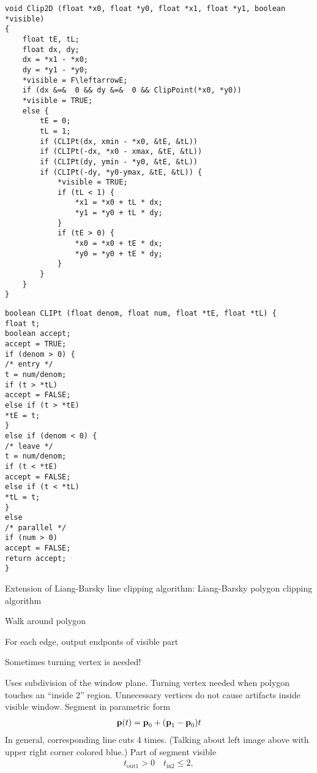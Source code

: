 \begin{compactdesc}
\begin{lstlisting}
void Clip2D (float *x0, float *y0, float *x1, float *y1, boolean *visible)
{
	float tE, tL;
	float dx, dy;
	dx = *x1 - *x0;
	dy = *y1 - *y0;
	*visible = F\leftarrowE;
	if (dx &=&  0 && dy &=&  0 && ClipPoint(*x0, *y0))
	*visible = TRUE;
	else {
		tE = 0;
		tL = 1;
		if (CLIPt(dx, xmin - *x0, &tE, &tL))
		if (CLIPt(-dx, *x0 - xmax, &tE, &tL))
		if (CLIPt(dy, ymin - *y0, &tE, &tL))
		if (CLIPt(-dy, *y0-ymax, &tE, &tL)) {
			*visible = TRUE;
			if (tL < 1) {
				*x1 = *x0 + tL * dx;
				*y1 = *y0 + tL * dy;
			}
			if (tE > 0) {
				*x0 = *x0 + tE * dx;
				*y0 = *y0 + tE * dy;
			}
		}
	}
}
		\end{lstlisting}
		\begin{lstlisting}
boolean CLIPt (float denom, float num, float *tE, float *tL) {
float t;
boolean accept;
accept = TRUE;
if (denom > 0) {
/* entry */
t = num/denom;
if (t > *tL)
accept = FALSE;
else if (t > *tE)
*tE = t;
}
else if (denom < 0) {
/* leave */
t = num/denom;
if (t < *tE)
accept = FALSE;
else if (t < *tL)
*tL = t;
}
else
/* parallel */
if (num > 0)
accept = FALSE;
return accept;
}
		\end{lstlisting}
	\item[\lp{Polygon clipping}] Extension of Liang-Barsky line clipping algorithm: Liang-Barsky polygon clipping algorithm\\
		\begin{enumerate*}[label=\protect\circled{\arabic*},itemjoin=]
			\item Walk around polygon\\
			\item For each edge, output endponts of visible part\\
			\item Sometimes turning vertex is needed!
		\end{enumerate*}
		Uses subdivision of the window plane. Turning vertex needed when polygon touches an ``inside 2'' region. Unnecessary vertices do not cause artifacts inside visible window. Segment in parametric form
		\begin{gather*}
			\bm{\mathrm{p}}(t)=\bm{\mathrm{p}}_0+(\bm{\mathrm{p}}_1-\bm{\mathrm{p}}_0)t
		\end{gather*}
		In general, corresponding line cuts 4 times.
(Talking about left image above with upper right corner colored blue.) Part of segment visible
\begin{gather*}
	t_{\text{out}1}>0\quad t_{\text{in}2}\leq 2,
\end{gather*}

\end{compactdesc}
